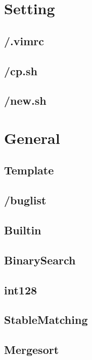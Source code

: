 \section{Setting}

\subsection{/.vimrc}

\subsection{/cp.sh}

\subsection{/new.sh}


\section{General}

\subsection{Template}

\subsection{/buglist}

\subsection{Builtin}

\subsection{BinarySearch}

\subsection{int128}

\subsection{StableMatching}

\subsection{Mergesort}

